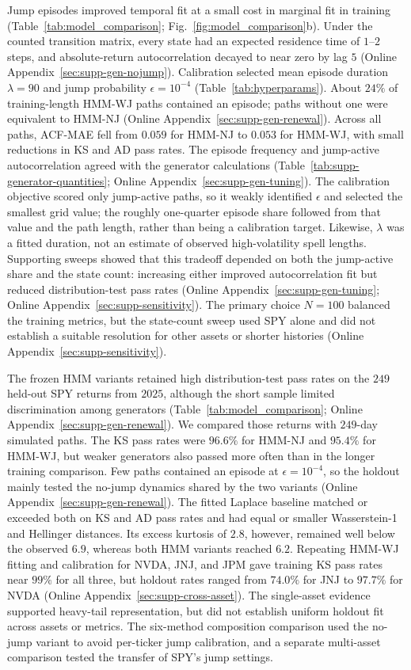Jump episodes improved temporal fit at a small cost in marginal fit
in training (Table~\ref{tab:model_comparison};
Fig.~\ref{fig:model_comparison}b). Under the counted transition
matrix, every state had an expected residence time of $1$--$2$ steps,
and absolute-return autocorrelation decayed to near zero by lag $5$
(Online Appendix~\ref{sec:supp-gen-nojump}). Calibration selected mean episode
duration $\lambda=90$ and jump probability $\epsilon=10^{-4}$
(Table~\ref{tab:hyperparams}). About $24\%$ of training-length HMM-WJ
paths contained an episode; paths without one were equivalent to
HMM-NJ (Online Appendix~\ref{sec:supp-gen-renewal}). Across all paths,
ACF-MAE fell from $0.059$ for HMM-NJ to $0.053$ for HMM-WJ, with
small reductions in KS and AD pass rates. The episode frequency and
jump-active autocorrelation agreed with the generator calculations
(Table~\ref{tab:supp-generator-quantities}; Online Appendix~\ref{sec:supp-gen-tuning}). The calibration objective scored
only jump-active paths, so it weakly identified $\epsilon$ and
selected the smallest grid value; the roughly one-quarter episode
share followed from that value and the path length, rather than being
a calibration target. Likewise, $\lambda$ was a fitted duration,
not an estimate of observed high-volatility spell lengths. Supporting sweeps showed that this tradeoff depended on both the
jump-active share and the state count: increasing either improved
autocorrelation fit but reduced distribution-test pass rates (Online
Appendix~\ref{sec:supp-gen-tuning}; Online Appendix~\ref{sec:supp-sensitivity}).
The primary choice $N=100$ balanced the training metrics, but the
state-count sweep used SPY alone and did not establish a suitable
resolution for other assets or shorter histories (Online
Appendix~\ref{sec:supp-sensitivity}).

The frozen HMM variants retained high distribution-test pass rates on
the $249$ held-out SPY returns from $2025$, although the short sample
limited discrimination among generators
(Table~\ref{tab:model_comparison};
Online Appendix~\ref{sec:supp-gen-renewal}). We compared those returns
with $249$-day simulated paths. The KS pass rates were $96.6\%$ for
HMM-NJ and $95.4\%$ for HMM-WJ, but weaker generators also passed
more often than in the longer training comparison. Few paths
contained an episode at $\epsilon=10^{-4}$, so the holdout mainly
tested the no-jump dynamics shared by the two variants (Online
Appendix~\ref{sec:supp-gen-renewal}). The fitted Laplace baseline
matched or exceeded both on KS and AD pass rates and had equal or
smaller Wasserstein-1 and Hellinger distances. Its excess kurtosis of
$2.8$, however, remained well below the observed $6.9$, whereas both
HMM variants reached $6.2$. Repeating HMM-WJ fitting and calibration
for NVDA, JNJ, and JPM gave training KS pass rates near $99\%$ for
all three, but holdout rates ranged from $74.0\%$ for JNJ to
$97.7\%$ for NVDA (Online Appendix~\ref{sec:supp-cross-asset}). The single-asset evidence supported heavy-tail representation, but
did not establish uniform holdout fit across assets or metrics. The six-method composition comparison used
the no-jump variant to avoid per-ticker jump calibration, and a
separate multi-asset comparison tested the transfer of SPY's jump
settings.

